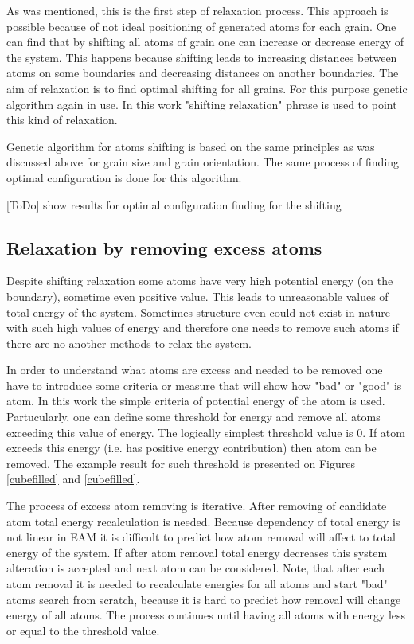 \documentclass[12pt]{report}
\begin{document}
As was mentioned, this is the first step of relaxation process. This approach is possible because of not ideal positioning of generated atoms for each grain. One can find that by shifting all atoms of grain one can increase or decrease energy of the system. This happens because shifting leads to increasing distances between atoms on some boundaries and decreasing distances on another boundaries. The aim of relaxation is to find optimal shifting for all grains. For this purpose genetic algorithm again in use. In this work "shifting relaxation" phrase is used to point this kind of relaxation.

Genetic algorithm for atoms shifting is based on the same principles as was discussed above for grain size and grain orientation. The same process of finding optimal configuration is done for this algorithm. 

[ToDo] show results for optimal configuration finding for the shifting

\subsection{Relaxation by removing excess atoms}

Despite shifting relaxation some atoms have very high potential energy (on the boundary), sometime even positive value. This leads to unreasonable values of total energy of the system. Sometimes structure even could not exist in nature with such high values of energy and therefore one needs to remove such atoms if there are no another methods to relax the system.

In order to understand what atoms are excess and needed to be removed one have to introduce some criteria or measure that will show how "bad" or "good" is atom. In this work the simple criteria of potential energy of the atom is used. Partucularly, one can define some threshold for energy and remove all atoms exceeding this value of energy. The logically simplest threshold value is 0. If atom exceeds this energy (i.e. has positive energy contribution) then atom can be removed. The example result for such threshold is presented on Figures \ref{cubefilled} and \ref{cubefilled}.

The process of excess atom removing is iterative. After removing of candidate atom total energy recalculation is needed. Because dependency of total energy is not linear in EAM it is difficult to predict how atom removal will affect to total energy of the system. If after atom removal total energy decreases this system alteration is accepted and next atom can be considered. Note, that after each atom removal it is needed to recalculate energies for all atoms and start "bad" atoms search from scratch, because it is hard to predict how removal will change energy of all atoms. The process continues until having all atoms with energy less or equal to the threshold value.
\end{document}
